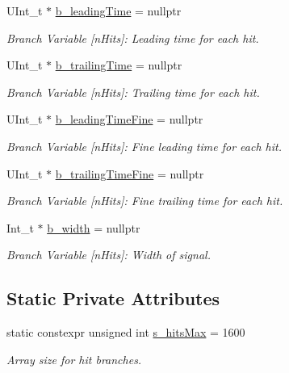 \begin{DoxyCompactItemize}
U\+Int\+\_\+t $\ast$ \hyperlink{class_event_tree_manager_a4a117b0ff10078a9946096a868f243ce}{b\+\_\+leading\+Time} = nullptr
\begin{DoxyCompactList}\small\item\em Branch Variable \mbox{[}n\+Hits\mbox{]}\+: Leading time for each hit. \end{DoxyCompactList}\item 
U\+Int\+\_\+t $\ast$ \hyperlink{class_event_tree_manager_ad7533269c176ad00ec0fffe2afdf351a}{b\+\_\+trailing\+Time} = nullptr
\begin{DoxyCompactList}\small\item\em Branch Variable \mbox{[}n\+Hits\mbox{]}\+: Trailing time for each hit. \end{DoxyCompactList}\item 
U\+Int\+\_\+t $\ast$ \hyperlink{class_event_tree_manager_af2d628b1f5c54595b2f2b618b175af6f}{b\+\_\+leading\+Time\+Fine} = nullptr
\begin{DoxyCompactList}\small\item\em Branch Variable \mbox{[}n\+Hits\mbox{]}\+: Fine leading time for each hit. \end{DoxyCompactList}\item 
U\+Int\+\_\+t $\ast$ \hyperlink{class_event_tree_manager_a6c06cd342910a86ac1db079dfd7c5da2}{b\+\_\+trailing\+Time\+Fine} = nullptr
\begin{DoxyCompactList}\small\item\em Branch Variable \mbox{[}n\+Hits\mbox{]}\+: Fine trailing time for each hit. \end{DoxyCompactList}\item 
Int\+\_\+t $\ast$ \hyperlink{class_event_tree_manager_aa65fec5d7e3a3b3983730033a6a4a7b8}{b\+\_\+width} = nullptr
\begin{DoxyCompactList}\small\item\em Branch Variable \mbox{[}n\+Hits\mbox{]}\+: Width of signal. \end{DoxyCompactList}\end{DoxyCompactItemize}
\subsection*{Static Private Attributes}
\begin{DoxyCompactItemize}
\item 
static constexpr unsigned int \hyperlink{class_event_tree_manager_aab35ad52374d52149bde894c8af7a8c5}{s\+\_\+hits\+Max} = 1600
\begin{DoxyCompactList}\small\item\em Array size for hit branches. \end{DoxyCompactList}\end{DoxyCompactItemize}
